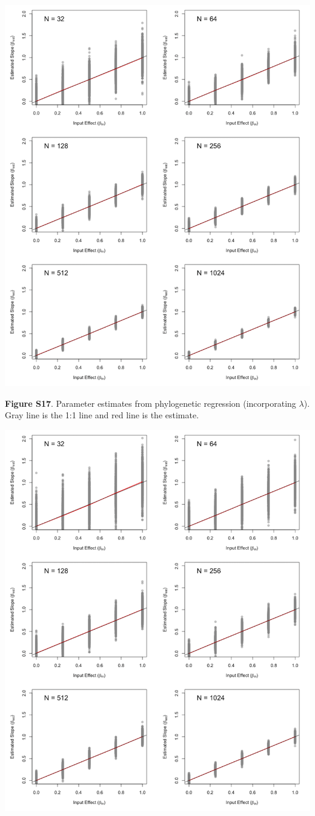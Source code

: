 \documentclass[
]{article}
\begin{document}
\includegraphics[width=0.95\linewidth]{fig.S17}

\textbf{Figure S17}. Parameter estimates from phylogenetic regression
(incorporating \(\lambda\)). Gray line is the 1:1 line and red line is
the estimate.

\includegraphics[width=0.95\linewidth]{fig.S18}
\end{document}
